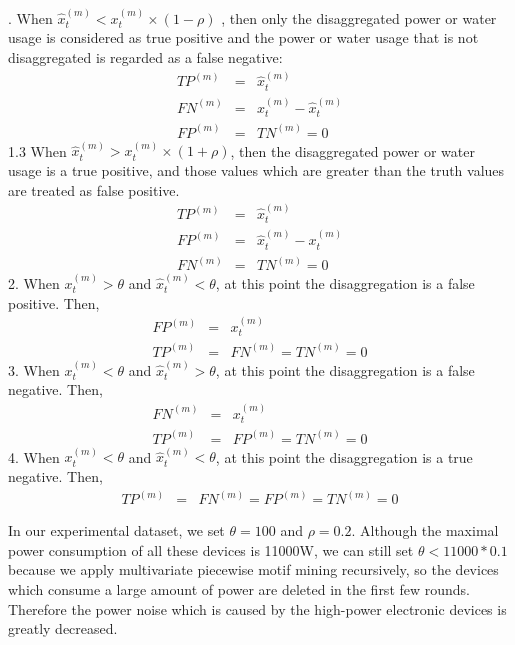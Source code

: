 . When $ \hat{x}_t^{(m)} < x_t^{(m)} \times (1-\rho)$ , then only
the disaggregated power or water usage is considered as true positive and
the power or water usage that is not disaggregated is regarded as a false negative:
\begin{eqnarray*}
TP^{(m)}&=&\hat{x}_t^{(m)} \\
FN^{(m)}&=&x_t^{(m)} - \hat{x}_t^{(m)} \\
FP^{(m)}&=&TN^{(m)}=0
\end{eqnarray*}
1.3 When $ \hat{x}_t^{(m)}>  x_t^{(m)} \times (1+\rho) $, then
the disaggregated power or water usage is a true positive, and those values
which are greater than the truth values are treated as false positive.
\begin{eqnarray*}
TP^{(m)}&=&\hat{x}_t^{(m)} \\
FP^{(m)}&=&\hat{x}_t^{(m)} - x_t^{(m)} \\
FN^{(m)}&=&TN^{(m)}=0
\end{eqnarray*}
2. When $x_t^{(m)} > \theta$ and  $\hat{x}_t^{(m)}< \theta  $,
at this point the disaggregation is a false positive.  Then,
\begin{eqnarray*}
FP^{(m)}&=&x_t^{(m)} \\
TP^{(m)}&=&FN^{(m)} =TN^{(m)}=0
\end{eqnarray*}
3. When $x_t^{(m)} < \theta$ and  $\hat{x}_t^{(m)} > \theta  $,
at this point the disaggregation is a false negative. Then,
\begin{eqnarray*}
FN^{(m)}&=&x_t^{(m)} \\
TP^{(m)}&=&FP^{(m)} = TN^{(m)}=0
\end{eqnarray*}
4. When $x_t^{(m)} < \theta$ and  $\hat{x}_t^{(m)} < \theta  $,
at this point the disaggregation is a true negative.  Then,
\begin{eqnarray*}
TP^{(m)}&=&FN^{(m)} = FP^{(m)} = TN^{(m)}=0
\end{eqnarray*}

In our experimental dataset, we set
$\theta=100$ and $\rho=0.2$. 
Although the maximal power consumption of all these devices is 11000W, 
we can still set $\theta < 11000 * 0.1$ because we apply multivariate piecewise motif mining recursively, 
so the devices which consume a large amount of power are deleted in the first few rounds. 
Therefore the power noise which is caused by the high-power electronic devices 
is greatly decreased. 
